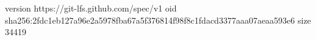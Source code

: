 version https://git-lfs.github.com/spec/v1
oid sha256:2fdc1eb127a96e2a5978fba67a5f376814f98f8c1fdacd3377aaa07aeaa593e6
size 34419
